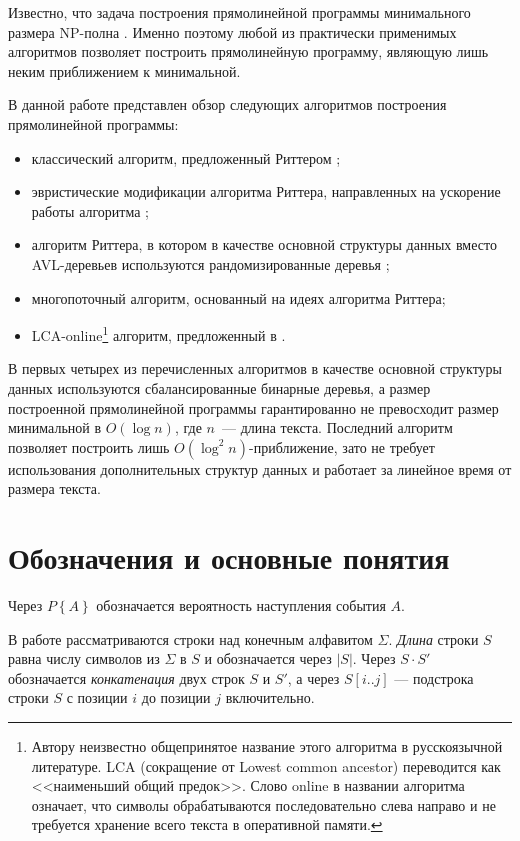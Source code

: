 \documentclass[14pt]{article}
\begin{document}
Известно, что задача построения прямолинейной программы минимального размера NP-полна \cite{SmallestCFG}. Именно поэтому
любой из практически применимых алгоритмов позволяет построить прямолинейную программу, являющую лишь неким приближением к минимальной.

В данной работе представлен обзор следующих алгоритмов построения прямолинейной программы:
\begin{itemize} 
	\item классический алгоритм, предложенный Риттером \cite{RytterSLPConstruction};
	\item эвристические модификации алгоритма Риттера, направленных на ускорение работы алгоритма \cite{ModernRytterAlgorithm};
	\item алгоритм Риттера, в котором в качестве основной структуры данных вместо AVL-деревьев
		используются рандомизированные деревья \cite{OurPracticalTest};
	\item многопоточный алгоритм, основанный на идеях алгоритма Риттера;
	\item LCA-online\footnote{Автору неизвестно общепринятое название этого алгоритма в русскоязычной литературе.
	LCA (сокращение от Lowest common ancestor) переводится как <<наименьший общий предок>>. Слово online в названии алгоритма
	означает, что символы обрабатываются последовательно слева направо и не требуется хранение всего текста в оперативной памяти.}
	алгоритм, предложенный в \cite{LCAOnlineSLP}.
\end{itemize}

В первых четырех из перечисленных алгоритмов в качестве основной структуры данных используются сбалансированные бинарные деревья,
а размер построенной прямолинейной программы гарантированно не превосходит размер минимальной в $O(\log n)$, где $n$~--- длина текста.
Последний алгоритм позволяет построить лишь $O(\log^2 n)$-приближение, зато не требует использования дополнительных структур
данных и работает за линейное время от размера текста.

\section{Обозначения и основные понятия}

Через $P\left\{A\right\}$ обозначается вероятность наступления события $A$.

В работе рассматриваются строки над конечным алфавитом $\Sigma$. \emph{Длина} строки $S$ равна числу символов из $\Sigma$ в $S$ и
обозначается через $|S|$. Через $S\cdot S'$ обозначается \emph{конкатенация} двух строк $S$ и $S'$, а через $S[i..j]$ --- подстрока
строки $S$ с позиции $i$ до позиции $j$ включительно.
\end{document}
